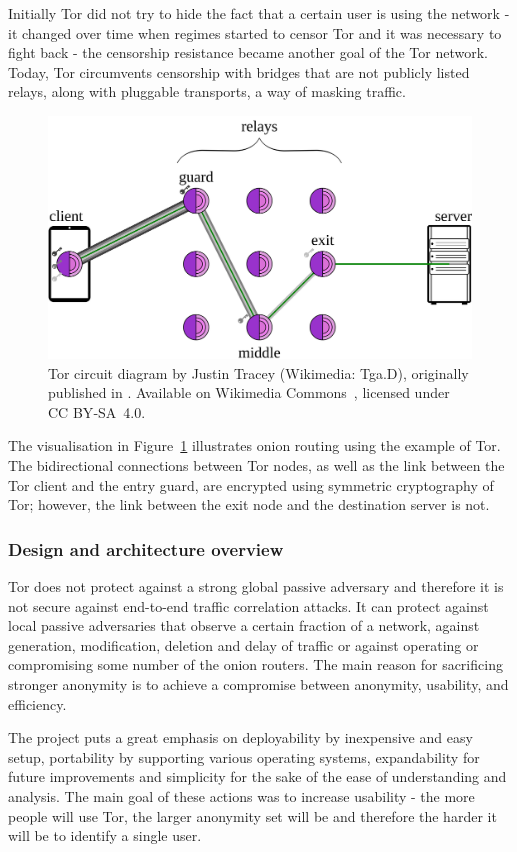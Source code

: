 Initially Tor did not try to hide the fact that a certain user is using the network - it changed over time when regimes started to censor Tor and it was necessary to fight back - the censorship resistance became another goal of the Tor network. Today, Tor circumvents censorship with bridges that are not publicly listed relays, along with pluggable transports, a way of masking traffic.

\begin{figure}[ht]
  \centering
  \includegraphics[width=0.75\linewidth]{Images/tor.png}
  \caption{Tor circuit diagram by Justin Tracey (Wikimedia: Tga.D), originally published in \cite{tracey_thesis}. Available on Wikimedia Commons~\cite{tracey_tor_circuit}, licensed under CC BY‑SA 4.0.}
  \label{fig:tor_circuit}
\end{figure}

The visualisation in Figure~\ref{fig:tor_circuit} illustrates onion routing using the example of Tor. The bidirectional connections between Tor nodes, as well as the link between the Tor client and the entry guard, are encrypted using symmetric cryptography of Tor; however, the link between the exit node and the destination server is not.

\subsubsection{Design and architecture overview}
Tor does not protect against a strong global passive adversary and therefore it is not secure against end-to-end traffic correlation attacks. It can protect against local passive adversaries that observe a certain fraction of a network, against generation, modification, deletion and delay of traffic or against operating or compromising some number of the onion routers. The main reason for sacrificing stronger anonymity is to achieve a compromise between anonymity, usability, and efficiency.

The project puts a great emphasis on deployability by inexpensive and easy setup, portability by supporting various operating systems, expandability for future improvements and simplicity for the sake of the ease of understanding and analysis. The main goal of these actions was to increase usability - the more people will use Tor, the larger anonymity set will be and therefore the harder it will be to identify a single user.


